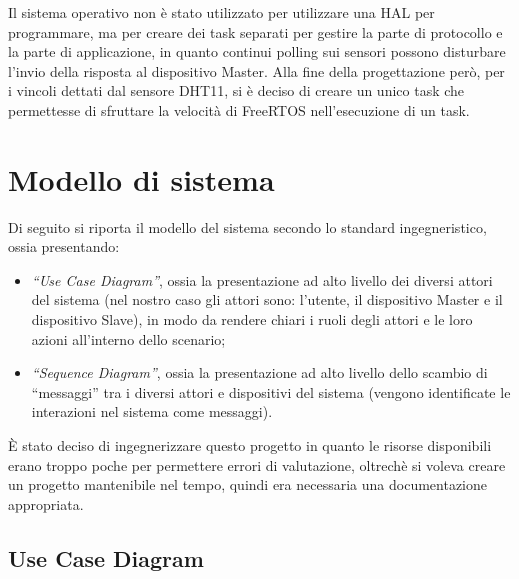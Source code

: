 \documentclass[a4paper,titlepage]{book}
\newcommand{\itema}{\begin{itemize}[noitemsep,topsep=10pt,parsep=5pt,partopsep=10pt]}
\begin{document}
Il sistema operativo non è stato utilizzato per utilizzare una HAL per programmare, ma per creare dei task separati per gestire la parte di protocollo e la parte di applicazione, in quanto continui polling sui sensori possono disturbare l'invio della risposta al dispositivo Master. Alla fine della progettazione però, per i vincoli dettati dal sensore DHT11, si è deciso di creare un unico task che permettesse di sfruttare la velocità di FreeRTOS nell'esecuzione di un task.




\chapter{Modello di sistema}

Di seguito si riporta il modello del sistema secondo lo standard ingegneristico, ossia presentando:

\itema 

\item\textit{``Use Case Diagram''}, ossia la presentazione ad alto livello dei diversi attori del sistema (nel nostro caso gli attori sono: l'utente, il dispositivo Master e il dispositivo Slave), in modo da rendere chiari i ruoli degli attori e le loro azioni all'interno dello scenario;
\item\textit{``Sequence Diagram''}, ossia la presentazione ad alto livello dello scambio di ``messaggi'' tra i diversi attori e dispositivi del sistema (vengono identificate le interazioni nel sistema come messaggi).

\end{itemize}

È stato deciso di ingegnerizzare questo progetto in quanto le risorse disponibili erano troppo poche per permettere errori di valutazione, oltrechè si voleva creare un progetto mantenibile nel tempo, quindi era necessaria una documentazione appropriata.

\section{Use Case Diagram}
\end{document}
